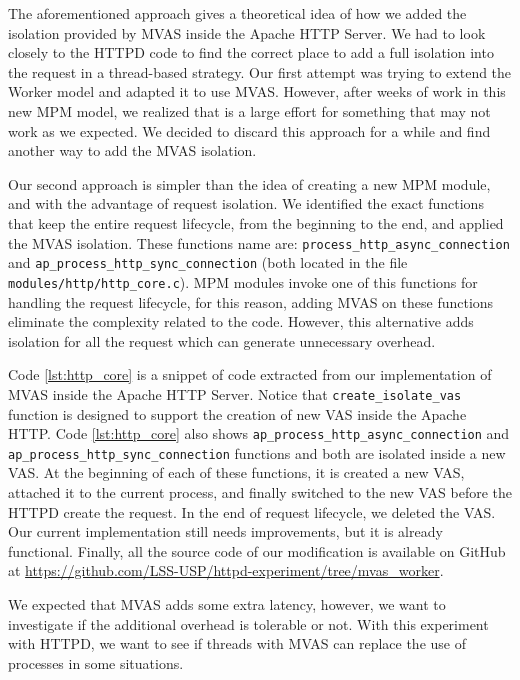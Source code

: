 The aforementioned approach gives a theoretical idea of how we added the
isolation provided by MVAS inside the Apache HTTP Server. We had to look
closely to the HTTPD code to find the correct place to add a full isolation
into the request in a thread-based strategy. Our first attempt was trying to
extend the Worker model and adapted it to use MVAS. However, after weeks of
work in this new MPM model, we realized that is a large effort for something
that may not work as we expected. We decided to discard this approach for a
while and find another way to add the MVAS isolation.
 
Our second approach is simpler than the idea of creating a new MPM module, and
with the advantage of request isolation. We identified the exact functions that
keep the entire request lifecycle, from the beginning to the end, and applied
the MVAS isolation. These functions name are:
\texttt{process\_http\_async\_connection} and
\texttt{ap\_process\_http\_sync\_connection} (both located in the file
\texttt{modules/http/http\_core.c}). MPM modules invoke one of this functions
for handling the request lifecycle, for this reason, adding MVAS on these
functions eliminate the complexity related to the code. However, this
alternative adds isolation for all the request which can generate unnecessary
overhead. 

Code \ref{lst:http_core} is a snippet of code extracted from our implementation
of MVAS inside the Apache HTTP Server. Notice that
\texttt{create\_isolate\_vas} function is designed to support the creation of
new VAS inside the Apache HTTP. Code \ref{lst:http_core} also shows
\texttt{ap\_process\_http\_async\_connection} and
\texttt{ap\_process\_http\_sync\_connection} functions and both are isolated
inside a new VAS. At the beginning of each of these functions, it is created a
new VAS, attached it to the current process, and finally switched to the new
VAS before the HTTPD create the request. In the end of request lifecycle, we
deleted the VAS. Our current implementation still needs improvements, but it is
already functional. Finally, all the source code of our modification is
available on GitHub at
\url{https://github.com/LSS-USP/httpd-experiment/tree/mvas\_worker}.



We expected that MVAS adds some extra latency, however, we want to investigate
if the additional overhead is tolerable or not. With this experiment with
HTTPD, we want to see if threads with MVAS can replace the use of processes in
some situations.

